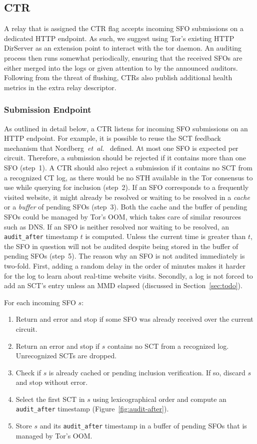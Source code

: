 \subsection{CTR}
A relay that is assigned the CTR flag accepts incoming SFO submissions on a
dedicated HTTP endpoint.  As such, we suggest using Tor's existing HTTP
DirServer as an extension point to interact with the tor daemon.  An auditing
process then runs somewhat periodically, ensuring that the received SFOs are
either merged into the logs or given attention to by the announced auditors.
Following from the threat of flushing, CTRs also publish additional health
metrics in the extra relay descriptor.

\subsubsection{Submission Endpoint}
As outlined in detail below, a CTR listens for incoming SFO submissions on an
HTTP endpoint.  For example, it is possible to reuse the SCT feedback mechanism
that Nordberg~\emph{et~al.}~\cite{nordberg} defined.  At most one SFO is
expected per circuit.  Therefore, a submission should be rejected if it
contains more than one SFO (step~1).  A CTR should also reject a submission if
it contains no SCT from a recognized CT log, as there would be no STH available
in the Tor consensus to use while querying for inclusion (step~2).
If an SFO corresponds to a frequently visited website, it might already be
resolved or waiting to be resolved in a \emph{cache} or a \emph{buffer} of
pending SFOs (step~3).  Both the cache and the buffer of pending SFOs could be
managed by Tor's OOM, which takes care of similar resources such as DNS.  If an
SFO is neither resolved nor waiting to be resolved, an \texttt{audit\_after}
timestamp $t$ is computed.  Unless the current time is greater than $t$, the SFO
in question will not be audited despite being stored in the buffer of pending
SFOs (step~5).  The reason why an SFO is not audited immediately is two-fold.
First, adding a random delay in the order of minutes makes it harder for the log
to learn about real-time website visits.  Secondly, a log is not forced to add
an SCT's entry unless an MMD elapsed (discussed in Section~\ref{sec:todo}).

For each incoming SFO $s$:
\begin{enumerate}
	\item Return and error and stop if some SFO was already received over the
		current circuit.
	\item Return an error and stop if $s$ contains no SCT from a recognized log.
		Unrecognized SCTs are dropped. %
	\item Check if $s$ is already cached or pending inclusion verification.
		If so, discard $s$ and stop without error.
	\item Select the first SCT in $s$ using lexicographical order and compute
		an \texttt{audit\_after} timestamp (Figure~\ref{fig:audit-after}).
	\item Store $s$ and its \texttt{audit\_after} timestamp in a buffer of
		pending SFOs that is managed by Tor's OOM.
\end{enumerate}


